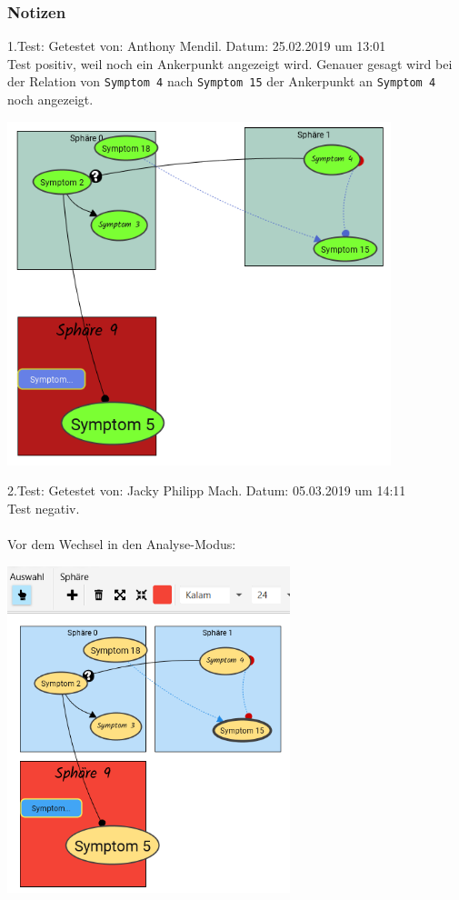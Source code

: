 \documentclass[enabledeprecatedfontcommands]{scrartcl}
\begin{document}
\subsubsection{Notizen}
1.Test: Getestet von: Anthony Mendil. Datum: 25.02.2019 um 13:01 \\
Test positiv, weil noch ein Ankerpunkt angezeigt wird. Genauer gesagt wird bei der Relation von \texttt{Symptom 4} nach \texttt{Symptom 15} der Ankerpunkt an \texttt{Symptom 4} noch angezeigt. \\
\begin{center}
\includegraphics[height=10cm]{3_43.PNG}
\end{center}
2.Test: Getestet von: Jacky Philipp Mach. Datum: 05.03.2019 um 14:11 \\
Test negativ. \\\\
\newpage
Vor dem Wechsel in den Analyse-Modus:
\begin{center}
\includegraphics[height=9.5cm]{3_45vorher.png}
\end{center}
\end{document}

